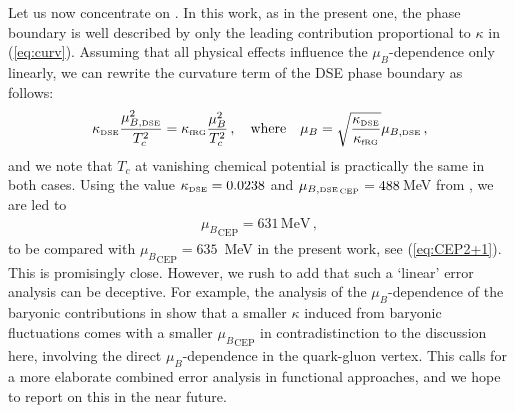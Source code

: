 \documentclass[%
reprint,
superscriptaddress,
showpacs,preprintnumbers,
 amsmath,amssymb,
 aps,
prd,
]{revtex4-1}
\def\eq#1{(\ref{#1})}
\def\0#1#2{\frac{#1}{#2}}
\begin{document}
Let us now concentrate on \cite{Fischer:2014ata}. In this work, as in
the present one, the phase boundary is well described by only the
leading contribution proportional to $\kappa$ in
\eq{eq:curv}. Assuming that all physical effects influence the
$\mu_B$-dependence only linearly, we can rewrite the curvature term of
the DSE phase boundary as follows:
%
\begin{align}
  \kappa_\textrm{\tiny{DSE}}\0{\mu_{B,\textrm{\tiny{DSE}}}^2}{T_c^2}=
  \kappa_\textrm{\tiny{fRG}}  \0{\mu_B^2}{T_c^2}\,,\quad \textrm{where}
  \quad \mu_{B} = \sqrt{\0{\kappa_\textrm{\tiny{DSE}}}{
  \kappa_\textrm{\tiny{fRG}} } }\mu_{B,\textrm{\tiny{DSE}}}\,,
\end{align}
%
and we note that $T_c$ at vanishing chemical potential is practically
the same in both cases.  Using the value
$\kappa_\textrm{\tiny{DSE}}=0.0238$ and
${\mu_{B,\textrm{\tiny{DSE}}_\textrm{\,\tiny{CEP}}}} =488\,$MeV from
\cite{Fischer:2014ata, Fischer:2018sdj}, we are led to
%
\begin{align}
  { \mu_B}_\textrm{CEP} = 631\,\textrm{MeV} \,,
\end{align}
%
to be compared with $ { \mu_B}_\textrm{CEP}=635$\, MeV in the present
work, see \eq{eq:CEP2+1}. This is promisingly close. However, we rush
to add that such a `linear' error analysis can be deceptive. For
example, the analysis of the $\mu_B$-dependence of the baryonic
contributions in \cite{Eichmann:2015kfa, Fischer:2018sdj} show that a
smaller $\kappa$ induced from baryonic fluctuations comes with a
smaller $ { \mu_B}_\textrm{CEP}$ in contradistinction to the
discussion here, involving the direct $\mu_B$-dependence in the
quark-gluon vertex. This calls for a more elaborate combined error
analysis in functional approaches, and we hope to report on this in
the near future.
\end{document}

